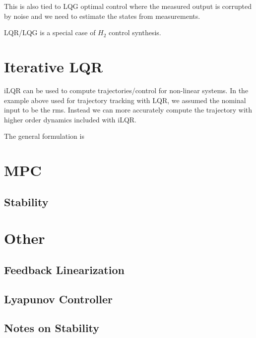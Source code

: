 This is also tied to LQG optimal control where the measured output is corrupted by noise and we need to estimate the states from measurements. 

LQR/LQG is a special case of $H_2$ control synthesis.

\section{Iterative LQR}
iLQR can be used to compute trajectories/control for non-linear systems. In the example above used for trajectory tracking with LQR, we assumed the nominal input to be the rms. Instead we can more accurately compute the trajectory with higher order dynamics included with iLQR. 

The general formulation is
\section{MPC}
\subsection{Stability}
\section{Other}
\subsection{Feedback Linearization}
\subsection{Lyapunov Controller}
\subsection{Notes on Stability}